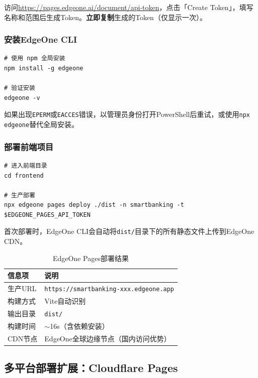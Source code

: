 访问\url{https://pages.edgeone.ai/document/api-token}，点击「Create Token」，填写名称和范围后生成Token。\textbf{立即复制}生成的Token（仅显示一次）。

\subsubsection*{安装EdgeOne CLI}

\begin{lstlisting}[style=shell]
# 使用 npm 全局安装
npm install -g edgeone

# 验证安装
edgeone -v
\end{lstlisting}

\begin{notebox}[Windows权限问题]
如果出现\texttt{EPERM}或\texttt{EACCES}错误，以管理员身份打开PowerShell后重试，或使用\texttt{npx edgeone}替代全局安装。
\end{notebox}

\subsubsection*{部署前端项目}

\begin{lstlisting}[style=shell]
# 进入前端目录
cd frontend

# 生产部署
npx edgeone pages deploy ./dist -n smartbanking -t $EDGEONE_PAGES_API_TOKEN
\end{lstlisting}

首次部署时，EdgeOne CLI会自动将\texttt{dist/}目录下的所有静态文件上传到EdgeOne CDN。

\begin{table}[H]
\centering
\begin{tabular}{ll}
\toprule
\textbf{信息项} & \textbf{说明} \\
\midrule
生产URL & \texttt{https://smartbanking-xxx.edgeone.app} \\
构建方式 & Vite自动识别 \\
输出目录 & \texttt{dist/} \\
构建时间 & $\sim$16s（含依赖安装） \\
CDN节点 & EdgeOne全球边缘节点（国内访问优势） \\
\bottomrule
\end{tabular}
\caption{EdgeOne Pages部署结果}
\end{table}

\subsection{多平台部署扩展：Cloudflare Pages}

